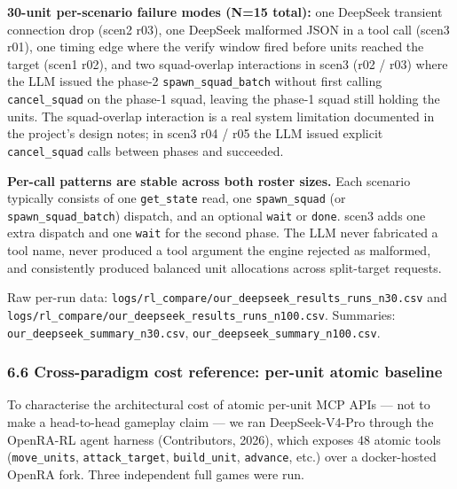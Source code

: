 \documentclass[
  journal]{IEEEtran}
\begin{document}
\textbf{30-unit per-scenario failure modes (N=15 total):} one DeepSeek
transient connection drop (scen2 r03), one DeepSeek malformed JSON in a
tool call (scen3 r01), one timing edge where the verify window fired
before units reached the target (scen1 r02), and two squad-overlap
interactions in scen3 (r02 / r03) where the LLM issued the phase-2
\texttt{spawn\_squad\_batch} without first calling
\texttt{cancel\_squad} on the phase-1 squad, leaving the phase-1 squad
still holding the units. The squad-overlap interaction is a real system
limitation documented in the project's design notes; in scen3 r04 / r05
the LLM issued explicit \texttt{cancel\_squad} calls between phases and
succeeded.

\textbf{Per-call patterns are stable across both roster sizes.} Each
scenario typically consists of one \texttt{get\_state} read, one
\texttt{spawn\_squad} (or \texttt{spawn\_squad\_batch}) dispatch, and an
optional \texttt{wait} or \texttt{done}. scen3 adds one extra dispatch
and one \texttt{wait} for the second phase. The LLM never fabricated a
tool name, never produced a tool argument the engine rejected as
malformed, and consistently produced balanced unit allocations across
split-target requests.

Raw per-run data:
\texttt{logs/rl\_compare/our\_deepseek\_results\_runs\_n30.csv} and
\texttt{logs/rl\_compare/our\_deepseek\_results\_runs\_n100.csv}.
Summaries: \texttt{our\_deepseek\_summary\_n30.csv},
\texttt{our\_deepseek\_summary\_n100.csv}.

\subsubsection{6.6 Cross-paradigm cost reference: per-unit atomic
baseline}\label{cross-paradigm-cost-reference-per-unit-atomic-baseline}

To characterise the architectural cost of atomic per-unit MCP APIs ---
not to make a head-to-head gameplay claim --- we ran DeepSeek-V4-Pro
through the OpenRA-RL agent harness (Contributors, 2026), which exposes
48 atomic tools (\texttt{move\_units}, \texttt{attack\_target},
\texttt{build\_unit}, \texttt{advance}, etc.) over a docker-hosted
OpenRA fork. Three independent full games were run.
\end{document}
